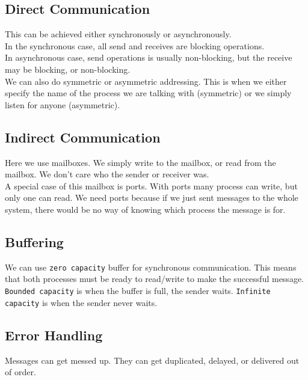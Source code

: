 \documentclass[12pt]{article}
\theoremstyle{definition}
\begin{document}
 \subsection{Direct Communication}
 This can be achieved either synchronously or asynchronously. 
 \\ \linebreak
 In the synchronous case, all send and receives are blocking operations.
 \\ \linebreak
 In asynchronous case, send operations is usually non-blocking, but the receive may be blocking, or non-blocking.
 \\ \linebreak
 We can also do symmetric or asymmetric addressing. This is when we either specify the name of the process we are talking with (symmetric) or we simply listen for anyone (asymmetric).
 \\ \linebreak
 
 \subsection{Indirect Communication}
 Here we use mailboxes. We simply write to the mailbox, or read from the mailbox. We don't care who the sender or receiver was.
 \\ \linebreak
 A special case of this mailbox is ports. With ports many process can write, but only one can read. We need ports because if we just sent messages to the whole system, there would be no way of knowing which process the message is for.
 \\ \linebreak
 
 \subsection{Buffering}
 We can use \texttt{zero capacity} buffer for synchronous communication. This means that both processes must be ready to read/write to make the successful message.
 \\ \linebreak
\texttt{Bounded capacity} is when the buffer is full, the sender waits.
\texttt{Infinite capacity} is when the sender never waits.
\\ \linebreak

\subsection{Error Handling}
Messages can get messed up. They can get duplicated, delayed, or delivered out of order. 
 
\end{document}
